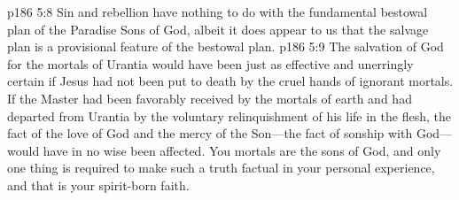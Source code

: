 \vs p186 5:8 Sin and rebellion have nothing to do with the fundamental bestowal plan of the Paradise Sons of God, albeit it does appear to us that the salvage plan is a provisional feature of the bestowal plan.
\vs p186 5:9 The salvation of God for the mortals of Urantia would have been just as effective and unerringly certain if Jesus had not been put to death by the cruel hands of ignorant mortals. If the Master had been favorably received by the mortals of earth and had departed from Urantia by the voluntary relinquishment of his life in the flesh, the fact of the love of God and the mercy of the Son---the fact of sonship with God---would have in no wise been affected. You mortals are the sons of God, and only one thing is required to make such a truth factual in your personal experience, and that is your spirit\hyp{}born faith.

